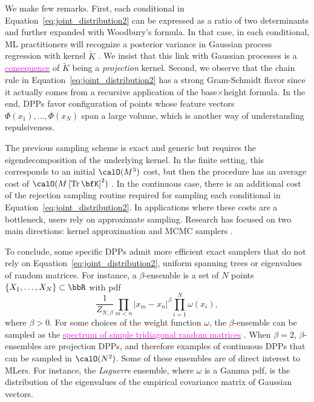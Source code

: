 \documentclass[twoside,11pt]{article}
\newcommand\eg{\text{e.g., }}
\newcommand\iid{\text{i.i.d.\,}}
\newcommand*{\Eqref}[1]{Equation~\ref{#1}}
\renewcommand{\tilde}{\widetilde}
\newcommand{\lrb}[1]{\left[ #1 \right]}
\newcommand{\lrabs}[1]{\left| #1 \right|}
\newcommand\Tr{\operatorname{Tr}}
\begin{document}
	  We make few remarks.
	  First, each conditional in \Eqref{eq:joint_distribution2} can be expressed as a ratio of two determinants and further expanded with Woodbury's formula.
	  In that case, in each conditional, ML practitioners will recognize  a posterior variance in Gaussian process regression with kernel $\tilde K$ \cite[Equation 2.26]{RaWi06}.
	  We insist that this link with Gaussian processes is a \href{https://dppy.readthedocs.io/en/latest/finite_dpps/exact_sampling.html#caution}{\textcolor{magenta}{consequence}} of $\tilde K$ being a \emph{projection} kernel.
	  Second, we observe that the chain rule in \Eqref{eq:joint_distribution2} has a strong Gram-Schmidt flavor since it actually comes from a recursive application of the base$\times$height formula.
	  In the end, DPPs favor configuration of points whose feature vectors $\Phi(x_1),\dots, \Phi(x_N)$ span a large volume, which is another way of understanding repulsiveness.

	  The previous sampling scheme is exact and generic but requires the eigendecomposition of the underlying kernel.
	  In the finite setting, this corresponds to an initial $\calO(M^3)$ cost, but then the procedure has an average cost of $\calO(M\lrb{\Tr \bfK}^2)$
	  \citep{TrBaAm18}.
	  In the continuous case, there is an additional cost of the rejection sampling routine required for sampling each conditional in \Eqref{eq:joint_distribution2}.
	  In applications where these costs are a bottleneck, users rely on approximate sampling.
	  Research has focused on two main directions: kernel approximation \citep{AKFT13} and MCMC samplers \citep{AnGhRe16, LiJeSr16c, GaBaVa17}.

	  To conclude, some specific DPPs admit more efficient exact samplers that do not rely on \Eqref{eq:joint_distribution2}, \eg uniform spanning trees \citep{PrWi98} or eigenvalues of random matrices.
	  For instance, a $\beta$-ensemble is a set of $N$ points $\{X_1,\dots,X_N\}\subset \bbR$ with pdf
	  \begin{equation*}
	  \label{eq:beta_ensemble_pdf}
	    \frac{1}{Z_{N,\beta}}
	    \prod_{m< n}
	      \lrabs{x_m-x_n}^{\beta}
	    \prod_{i= 1}^N
	      \omega(x_i),
	  \end{equation*}
	  where $\beta>0$.
	  For some choices of the weight function $\omega$, the $\beta$-ensemble can be sampled as the \href{https://dppy.readthedocs.io/en/latest/continuous_dpps/beta_ensembles.banded_models.html}{\textcolor{magenta}{spectrum of simple tridiagonal random matrices}} \citep{DuEd02,KiNe04}.
	  When $\beta=2$, $\beta$-ensembles are projection DPPs, and therefore examples of continuous DPPs that can be sampled in $\calO(N^2)$.
	  Some of these ensembles are of direct interest to MLers.
	  For instance, the \emph{Laguerre} ensemble, where $\omega$ is a Gamma pdf, is the distribution of the eigenvalues of the empirical covariance matrix of \iid Gaussian vectors.
\end{document}
